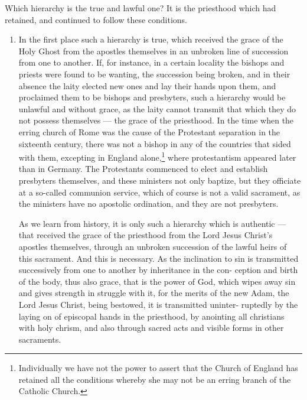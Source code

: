 Which hierarchy is the true and lawful one? 
It is the priesthood which had retained, and 
continued to follow these conditions. 

\begin{enumerate}
    \item In the first place such a hierarchy is true, 
    which received the grace of the Holy Ghost 
    from the apostles themselves in an unbroken 
    line of succession from one to another. If, for 
    instance, in a certain locality the bishops and 
    priests were found to be wanting, the succession
    being broken, and in their absence the 
    laity elected new ones and lay their hands upon 
    them, and proclaimed them to be bishops and 
    presbyters, such a hierarchy would be unlawful
    and without grace, as the laity cannot 
    transmit that which they do not possess themselves 
    — the grace of the priesthood. In the 
    time when the erring church of Rome was the 
    cause of the Protestant separation in the sixteenth
    century, there was not a bishop in any of 
    the countries that sided with them, excepting in 
    England alone,\footnote{Individually we have not the power to assert that 
    the Church of England has retained all the conditions 
    whereby she may not be an erring branch of the Catholic 
    Church.} where protestantism appeared 
    later than in Germany. The Protestants commenced
    to elect and establish presbyters themselves,
    and these ministers not only baptize, 
    but they officiate at a so-called communion 
    service, which of course is not a valid sacrament,
    as the ministers have no apostolic ordination,
    and they are not presbyters. 

    As we learn from history, it is only such a 
    hierarchy which is authentic — that received 
    the grace of the priesthood from the Lord 
    Jesus Christ's apostles themselves, through an 
    unbroken succession of the lawful heirs of this 
    sacrament. And this is necessary. As the 
    inclination to sin is transmitted successively 
    from one to another by inheritance in the con- 
    ception and birth of the body, thus also grace, 
    that is the power of God, which wipes away sin 
    and gives strength in struggle with it, for the 
    merits of the new Adam, the Lord Jesus Christ, 
    being bestowed, it is transmitted uninter- 
    ruptedly by the laying on of episcopal hands in 
    the priesthood, by anointing all christians with 
    holy chrism, and also through sacred acts and 
    visible forms in other sacraments. 


\end{enumerate}

